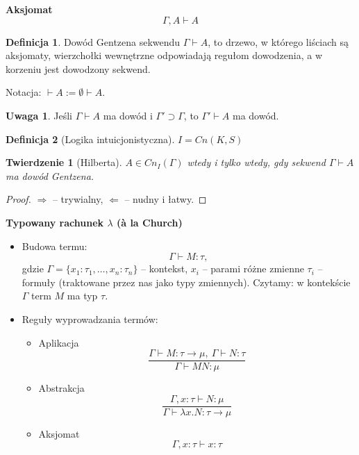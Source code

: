 \documentclass[10pt,a4paper]{article}
\theoremstyle{plain}
\newtheorem{theorem}{Twierdzenie}
\theoremstyle{definition}
\newtheorem*{definition}{Definicja}
\newtheorem*{remark}{Uwaga}
\newcommand{\impl}{\rightarrow}
\newcommand{\header}[1]{\noindent\textbf{#1}}
\begin{document}
\header{Aksjomat}
$$\Gamma, A \vdash A$$

\begin{definition}
Dowód Gentzena sekwendu $\Gamma \vdash A$, to drzewo, w którego liściach są
aksjomaty, wierzchołki wewnętrzne odpowiadają regułom dowodzenia, a w korzeniu
jest dowodzony sekwend.
\end{definition}

\noindent Notacja: $\vdash A := \emptyset \vdash A$.

\begin{remark}
Jeśli $\Gamma \vdash A$ ma dowód i $\Gamma' \supset \Gamma$, to
$\Gamma' \vdash A$ ma dowód.
\end{remark}


\begin{definition}[Logika intuicjonistyczna]
$I = Cn(K, S)$
\end{definition}

\begin{theorem}[Hilberta]
$A \in Cn_I(\Gamma)$ wtedy i tylko wtedy, gdy sekwend $\Gamma \vdash A$ ma
dowód Gentzena.
\end{theorem}

\begin{proof}
$\Rightarrow$ -- trywialny, $\Leftarrow$ -- nudny i łatwy.
\end{proof}

\header{Typowany rachunek $\lambda$ (à la Church)}
\begin{itemize}
  \item Budowa termu:
    $$\Gamma \vdash M:\tau,$$
    gdzie $\Gamma = \{x_1:\tau_1, \ldots, x_n:\tau_n\}$ -- kontekst,
    $x_i$ -- parami różne zmienne
    $\tau_i$ -- formuły (traktowane przez nas jako typy zmiennych).
    Czytamy: w kontekście $\Gamma$ term $M$ ma typ $\tau$.
  \item Reguły wyprowadzania termów:
    \begin{itemize}
      \item Aplikacja
        $$\frac{
          \Gamma \vdash M : \tau \impl \mu, \ \Gamma \vdash N : \tau
        }{
          \Gamma \vdash MN : \mu
        }$$
      \item Abstrakcja
        $$\frac{
          \Gamma, x:\tau \vdash N : \mu
        }{
          \Gamma \vdash \lambda x . N : \tau \impl \mu
        }$$
      \item Aksjomat
        $$\Gamma, x:\tau \vdash x:\tau$$
    \end{itemize}
\end{itemize}
\end{document}
